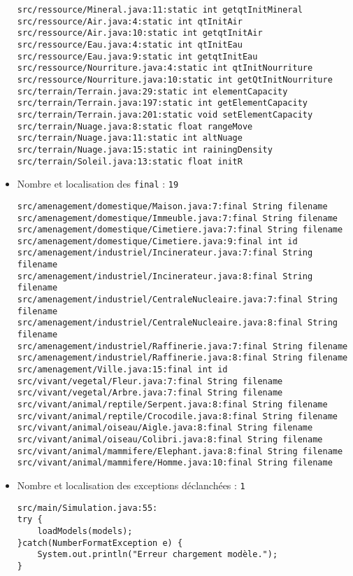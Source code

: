 \documentclass[11pt,a4paper]{article}
\begin{document}
\begin{itemize}
\begin{Verbatim}[xleftmargin=.3in, breaklines=true, breakanywhere=true]
src/ressource/Mineral.java:11:static int getqtInitMineral
src/ressource/Air.java:4:static int qtInitAir
src/ressource/Air.java:10:static int getqtInitAir
src/ressource/Eau.java:4:static int qtInitEau
src/ressource/Eau.java:9:static int getqtInitEau
src/ressource/Nourriture.java:4:static int qtInitNourriture
src/ressource/Nourriture.java:10:static int getQtInitNourriture
src/terrain/Terrain.java:29:static int elementCapacity
src/terrain/Terrain.java:197:static int getElementCapacity
src/terrain/Terrain.java:201:static void setElementCapacity
src/terrain/Nuage.java:8:static float rangeMove
src/terrain/Nuage.java:11:static int altNuage
src/terrain/Nuage.java:15:static int rainingDensity
src/terrain/Soleil.java:13:static float initR
\end{Verbatim}

\item{Nombre et localisation des \texttt{final} : \texttt{19}}
\begin{Verbatim}[xleftmargin=.3in, breaklines=true, breakanywhere=true]
src/amenagement/domestique/Maison.java:7:final String filename
src/amenagement/domestique/Immeuble.java:7:final String filename
src/amenagement/domestique/Cimetiere.java:7:final String filename
src/amenagement/domestique/Cimetiere.java:9:final int id
src/amenagement/industriel/Incinerateur.java:7:final String filename
src/amenagement/industriel/Incinerateur.java:8:final String filename
src/amenagement/industriel/CentraleNucleaire.java:7:final String filename
src/amenagement/industriel/CentraleNucleaire.java:8:final String filename
src/amenagement/industriel/Raffinerie.java:7:final String filename
src/amenagement/industriel/Raffinerie.java:8:final String filename
src/amenagement/Ville.java:15:final int id
src/vivant/vegetal/Fleur.java:7:final String filename
src/vivant/vegetal/Arbre.java:7:final String filename
src/vivant/animal/reptile/Serpent.java:8:final String filename
src/vivant/animal/reptile/Crocodile.java:8:final String filename
src/vivant/animal/oiseau/Aigle.java:8:final String filename
src/vivant/animal/oiseau/Colibri.java:8:final String filename
src/vivant/animal/mammifere/Elephant.java:8:final String filename
src/vivant/animal/mammifere/Homme.java:10:final String filename
\end{Verbatim}

\item{Nombre et localisation des exceptions déclanchées : \texttt{1}}
\begin{Verbatim}[xleftmargin=.3in, breaklines=true, breakanywhere=true]
src/main/Simulation.java:55:
try {
	loadModels(models);
}catch(NumberFormatException e) {
	System.out.println("Erreur chargement modèle.");
}
\end{Verbatim}
\end{itemize}
\end{document}
